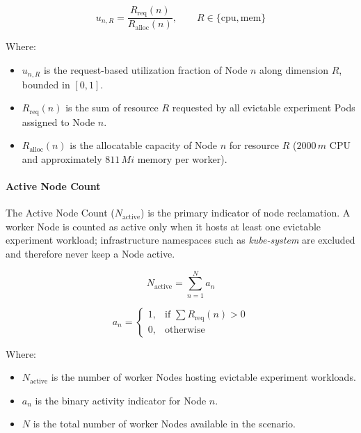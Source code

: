 \[
u_{n,R}
=
\frac{R_{\text{req}}(n)}
{R_{\text{alloc}}(n)},
\qquad
R \in \{\text{cpu}, \text{mem}\}
\]

Where:

\begin{itemize}
    \item \(u_{n,R}\) is the request-based utilization fraction of Node \(n\) along dimension \(R\), bounded in \([0,1]\).

    \item \(R_{\text{req}}(n)\) is the sum of resource \(R\) requested by all evictable experiment Pods assigned to Node \(n\).

    \item \(R_{\text{alloc}}(n)\) is the allocatable capacity of Node \(n\) for resource \(R\) (\(2000\,m\) CPU and approximately \(811\,Mi\) memory per worker).
\end{itemize}

\paragraph{Active Node Count}
\label{subsubsec:defrag_metric_active}
The Active Node Count (\(N_{\text{active}}\)) is the primary indicator of node reclamation. A worker Node is counted as active only when it hosts at least one evictable experiment workload; infrastructure namespaces such as \textit{kube-system} are excluded and therefore never keep a Node active.

\[
N_{\text{active}}
=
\sum_{n=1}^{N} a_n
\]

\[
a_n =
\begin{cases}
1, & \text{if } \sum R_{\text{req}}(n) > 0 \\
0, & \text{otherwise}
\end{cases}
\]

Where:

\begin{itemize}
    \item \(N_{\text{active}}\) is the number of worker Nodes hosting evictable experiment workloads.

    \item \(a_n\) is the binary activity indicator for Node \(n\).

    \item \(N\) is the total number of worker Nodes available in the scenario.
\end{itemize}

